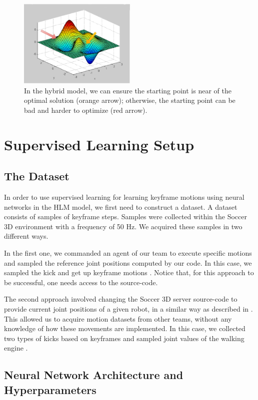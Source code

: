 \begin{figure}[!htbp]
	\centering
	\includegraphics[width=0.5\textwidth]{Cap5/optimization_final.eps}
	\caption{In the hybrid model, we can ensure the starting point is near of the optimal solution (orange arrow); otherwise, the starting point can be bad and harder to optimize (red arrow).}
	\label{optimization_intuition}
\end{figure}


\section{Supervised Learning Setup}\label{supervised_learning_setup}
\subsection{The Dataset}\label{AA}
In order to use supervised learning for learning keyframe motions using neural networks in the HLM model, we first need to construct a dataset. A dataset consists of samples of keyframe steps. Samples were collected within the Soccer 3D environment with a frequency of 50 Hz. We acquired these samples in two different ways.

In the first one, we commanded an agent of our team to execute specific motions and sampled the reference joint positions computed by our code. In this case, we sampled the kick and get up keyframe motions \cite{muniz2016}. Notice that, for this approach to be successful, one needs access to the source-code.

The second approach involved changing the Soccer 3D server source-code to provide current joint positions of a given robot, in a similar way as described in \cite{macalpine2013}. This allowed us to acquire motion datasets from other teams, without any knowledge of how these movements are implemented. In this case, we collected two types of kicks based on keyframes and sampled joint values of the walking engine \cite{AAAI12-MacAlpine}.


\subsection{Neural Network Architecture and Hyperparameters}

